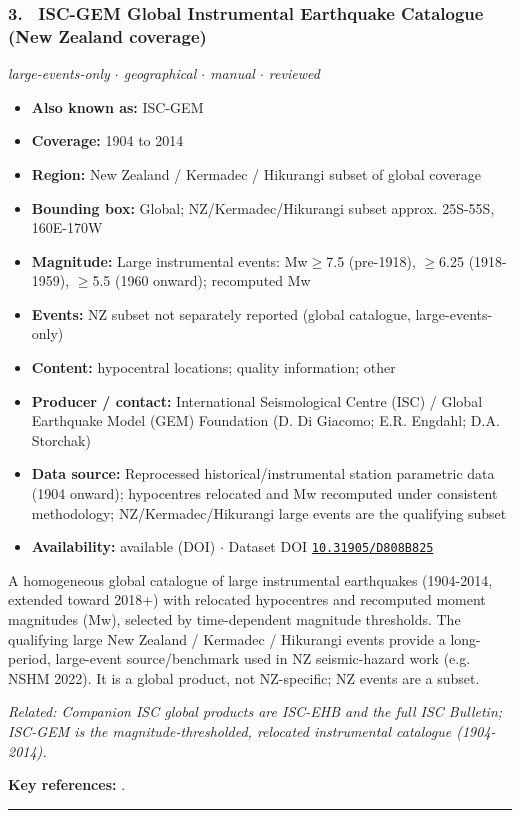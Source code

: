 \documentclass[10pt,a4paper]{article}
\newcommand{\catentryrule}{\par\vspace{3pt}\noindent\textcolor{rulegrey}{\rule{\linewidth}{0.3pt}}\par\vspace{5pt}}
\newcommand{\kv}[2]{\item \textbf{#1:} #2}
\begin{document}
\subsubsection*{\hypertarget{c:3}{3.}~ ISC-GEM Global Instrumental Earthquake Catalogue (New Zealand coverage)}
{\small\itshape large-events-only $\cdot$ geographical $\cdot$ manual $\cdot$ reviewed}\par\vspace{2pt}
\begin{itemize}[leftmargin=1.3em,itemsep=0.6pt,topsep=1pt,parsep=0pt]
\kv{Also known as}{ISC-GEM}
\kv{Coverage}{1904 to 2014}
\kv{Region}{New Zealand / Kermadec / Hikurangi subset of global coverage}
\kv{Bounding box}{Global; NZ/Kermadec/Hikurangi subset approx. 25S-55S, 160E-170W}
\kv{Magnitude}{Large instrumental events: Mw$\geq$7.5 (pre-1918), $\geq$6.25 (1918-1959), $\geq$5.5 (1960 onward); recomputed Mw}
\kv{Events}{NZ subset not separately reported (global catalogue, large-events-only)}
\kv{Content}{hypocentral locations; quality information; other}
\kv{Producer / contact}{International Seismological Centre (ISC) / Global Earthquake Model (GEM) Foundation (D. Di Giacomo; E.R. Engdahl; D.A. Storchak)}
\kv{Data source}{Reprocessed historical/instrumental station parametric data (1904 onward); hypocentres relocated and Mw recomputed under consistent methodology; NZ/Kermadec/Hikurangi large events are the qualifying subset}
\kv{Availability}{available (DOI) $\cdot$ Dataset DOI \href{https://doi.org/10.31905/D808B825}{\nolinkurl{10.31905/D808B825}}}
\end{itemize}
\par\vspace{2pt}A homogeneous global catalogue of large instrumental earthquakes (1904-2014, extended toward 2018+) with relocated hypocentres and recomputed moment magnitudes (Mw), selected by time-dependent magnitude thresholds. The qualifying large New Zealand / Kermadec / Hikurangi events provide a long-period, large-event source/benchmark used in NZ seismic-hazard work (e.g. NSHM 2022). It is a global product, not NZ-specific; NZ events are a subset.
\par{\small\itshape Related: Companion ISC global products are ISC-EHB and the full ISC Bulletin; ISC-GEM is the magnitude-thresholded, relocated instrumental catalogue (1904-2014).}
\par\vspace{2pt}\textbf{Key references:} \cite{DiGiacomo2018,Storchak2015,InternationalSeismologicalCentre2021}.
\catentryrule
\end{document}
